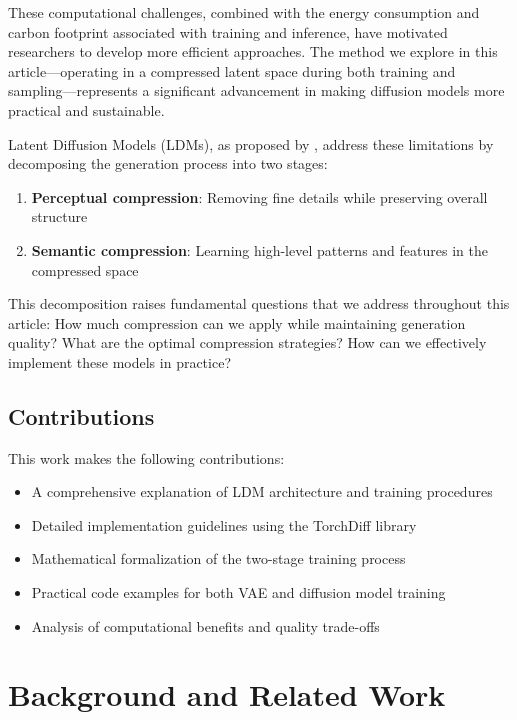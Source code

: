 \documentclass[12pt,twoside]{article}
\begin{document}
These computational challenges, combined with the energy consumption and carbon footprint associated with training and inference, have motivated researchers to develop more efficient approaches. The method we explore in this article—operating in a compressed latent space during both training and sampling—represents a significant advancement in making diffusion models more practical and sustainable.

Latent Diffusion Models (LDMs), as proposed by \cite{rombach2022high}, address these limitations by decomposing the generation process into two stages:
\begin{enumerate}[itemsep=0pt]
    \item \textbf{Perceptual compression}: Removing fine details while preserving overall structure
    \item \textbf{Semantic compression}: Learning high-level patterns and features in the compressed space
\end{enumerate}

This decomposition raises fundamental questions that we address throughout this article: How much compression can we apply while maintaining generation quality? What are the optimal compression strategies? How can we effectively implement these models in practice?

\subsection{Contributions}
\label{subsec:contributions}

This work makes the following contributions:
\begin{itemize}[itemsep=0pt]
    \item A comprehensive explanation of LDM architecture and training procedures
    \item Detailed implementation guidelines using the TorchDiff library
    \item Mathematical formalization of the two-stage training process
    \item Practical code examples for both VAE and diffusion model training
    \item Analysis of computational benefits and quality trade-offs
\end{itemize}

\section{Background and Related Work}
\label{sec:background}
\end{document}
